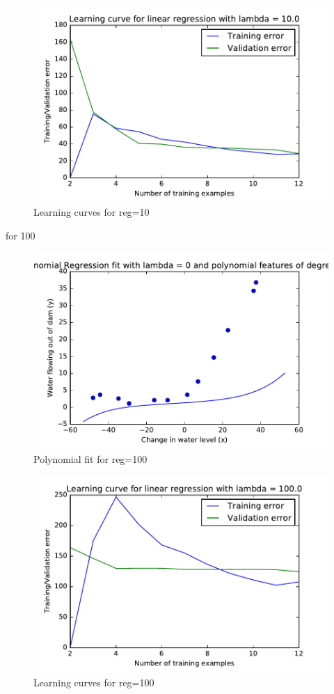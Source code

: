 \documentclass[pdftex,11pt]{article}
\begin{document}
\begin{figure}[H]
  \caption{Learning curves for reg=10}
  \centering
    \includegraphics[scale=1]{fig1010.pdf}
\end{figure}
for 100
\begin{figure}[H]
  \caption{Polynomial fit for reg=100}
  \centering
    \includegraphics[scale=1]{fig9100.pdf}
\end{figure}
\begin{figure}[H]
  \caption{Learning curves for  reg=100}
  \centering
    \includegraphics[scale=1]{fig10100.pdf}
\end{figure}
\end{document}
